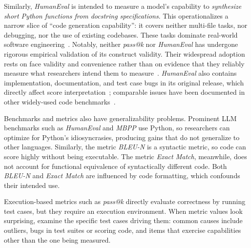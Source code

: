 \documentclass[smallextended]{svjour3}
\begin{document}
Similarly, \emph{HumanEval} is intended to measure a model's capability to \textit{synthesize short Python functions from docstring specifications}. This operationalizes a narrow slice of ``code generation capability'': it covers neither multi-file tasks, nor debugging, nor the use of existing codebases. These tasks dominate real-world software engineering~\cite{Chandra2025benchmarks}. Notably, neither \emph{pass@k} nor \emph{HumanEval} has undergone rigorous empirical validation of its construct validity. Their widespread adoption rests on face validity and convenience rather than on evidence that they reliably measure what researchers intend them to measure~\cite{cao2025should}. \emph{HumanEval} also contains implementation, documentation, and test case bugs in its original release, which directly affect score interpretation~\cite{DBLP:conf/nips/LiuXW023}; comparable issues have been documented in other widely-used code benchmarks~\cite{cao2025should}.

Benchmarks and metrics also have generalizability problems. Prominent LLM benchmarks such as \emph{HumanEval} and \emph{MBPP} use Python, so researchers can optimize for Python's idiosyncrasies, producing gains that do not generalize to other languages. Similarly, the metric \emph{BLEU-N} is a syntactic metric, so code can score highly without being executable. The metric \emph{Exact Match}, meanwhile, does not account for functional equivalence of syntactically different code. Both \emph{BLEU-N} and \emph{Exact Match} are influenced by code formatting, which confounds their intended use.

Execution-based metrics such as \emph{pass@k} directly evaluate correctness by running test cases, but they require an execution environment.
When metric values look surprising, examine the specific test cases driving them: common causes include outliers, bugs in test suites or scoring code, and items that exercise capabilities other than the one being measured.
\end{document}
